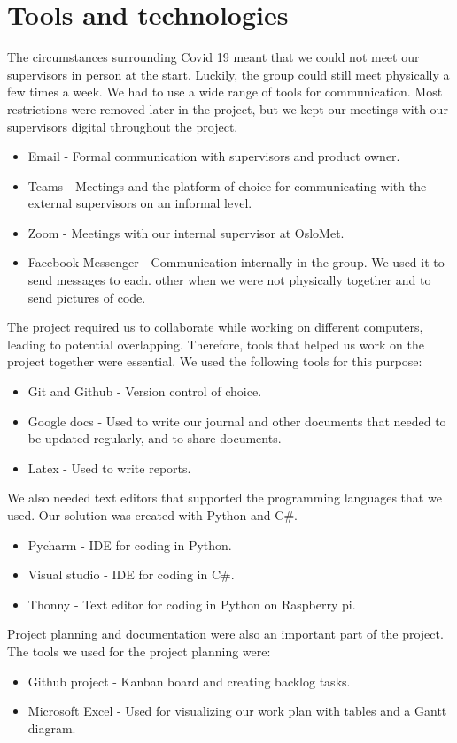 \section{Tools and technologies}
The circumstances surrounding Covid 19 meant that we could not meet our supervisors in person at the start. Luckily, the group could still meet physically a few times a week. We had to use a wide range of tools for communication. Most restrictions were removed later in the project, but we kept our meetings with our supervisors digital throughout the project. 

\begin{itemize}
	\item Email - Formal communication with supervisors and product owner.
	\item Teams - Meetings and the platform of choice for communicating with the external supervisors on an informal level. 
	\item Zoom - Meetings with our internal supervisor at OsloMet.
	\item Facebook Messenger - Communication internally in the group. We used it to send messages to each. other when we were not physically together and to send pictures of code.
\end{itemize}

The project required us to collaborate while working on different computers, leading to potential overlapping. Therefore, tools that helped us work on the project together were essential. We used the following tools for this purpose:

\begin{itemize}
	\item Git and Github - Version control of choice.
	\item Google docs - Used to write our journal and other documents that needed to be updated regularly, and to share documents. 
	\item Latex - Used to write reports.
\end{itemize}

We also needed text editors that supported the programming languages that we used. Our solution was created with Python and C\#.
\begin{itemize}
	\item Pycharm - IDE for coding in Python.
	\item Visual studio - IDE for coding in C\#.
	\item Thonny - Text editor for coding in Python on Raspberry pi.
\end{itemize}

Project planning and documentation were also an important part of the project. The tools we used for the project planning were:

\begin{itemize}
	\item Github project - Kanban board and creating backlog tasks.
	\item Microsoft Excel - Used for visualizing our work plan with tables and a Gantt diagram.
\end{itemize}
